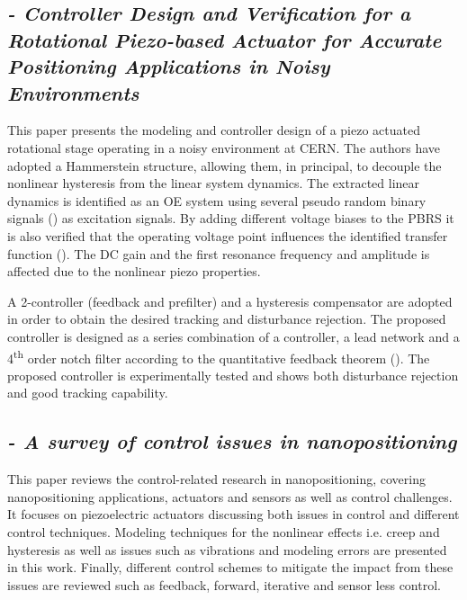 \subsection*{\citep*{ButcherController:2015} {\small \emph{- Controller Design and Verification for a Rotational Piezo-based Actuator for Accurate Positioning Applications in Noisy Environments}} }
This paper presents the modeling and controller design of a piezo actuated rotational stage operating in a noisy environment at CERN. The authors have adopted a Hammerstein structure, allowing them, in principal, to decouple the nonlinear hysteresis from the linear system dynamics. The extracted linear dynamics is identified as an OE system using several pseudo random binary signals (\abbrPBRS) as excitation signals. By adding different voltage biases to the PBRS it is also verified that the operating voltage point influences the identified transfer function (\abbrTF). The DC gain and the first resonance frequency and amplitude is affected due to the nonlinear piezo properties.

A 2-\abbrDOF controller (feedback and prefilter) and a hysteresis compensator are adopted in order to obtain the desired tracking and disturbance rejection. The proposed controller is designed as a series combination of a \abbrPID controller, a lead network and a 4\textsuperscript{th} order notch filter according to the quantitative feedback theorem (\abbrQFT). The proposed controller is experimentally tested and shows both disturbance rejection and good tracking capability.

\subsection*{\citep*{SurveyOfControlIssues:2007} {\small \emph{- A survey of control issues in nanopositioning}} }
This paper reviews the control-related research in nanopositioning, covering nanopositioning applications, actuators and sensors as well as control challenges. It focuses on piezoelectric actuators discussing both issues in control and different control techniques. Modeling techniques for the nonlinear effects i.e. creep and hysteresis as well as issues such as vibrations and modeling errors are presented in this work. Finally, different control schemes to mitigate the impact from these issues are reviewed such as feedback, forward, iterative and sensor less control.


